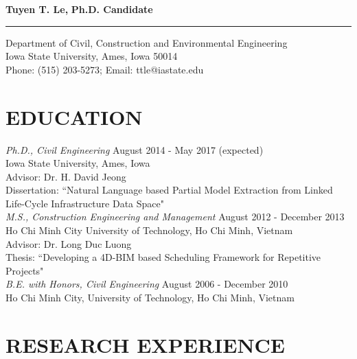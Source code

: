 \documentclass[11pt]{article}
\begin{document}
{\huge\bf Tuyen T. Le,} {\large\bf Ph.D. Candidate}\\ %
\noindent\rule{\linewidth}{1.25pt}
Department of Civil, Construction and Environmental Engineering\\ %
Iowa State University, Ames, Iowa 50014\\
Phone: (515) 203-5273; Email: ttle@iastate.edu
\section*{EDUCATION}

{\sl Ph.D., Civil Engineering}  \hfill August 2014 - May 2017 (expected) \\
Iowa State University, Ames, Iowa\\
Advisor: Dr. H. David Jeong\\
Dissertation: ``Natural Language based Partial Model Extraction from Linked Life-Cycle Infrastructure Data Space"\\

{\sl M.S., Construction Engineering and Management}  \hfill August 2012 - December 2013 \\
Ho Chi Minh City University of Technology, Ho Chi Minh, Vietnam\\
Advisor: Dr. Long Duc Luong\\
Thesis: ``Developing a 4D-BIM based Scheduling Framework for Repetitive Projects"\\

{\sl B.E. with Honors, Civil Engineering}  \hfill August 2006 - December 2010 \\
Ho Chi Minh City, University of Technology, Ho Chi Minh, Vietnam
\section*{RESEARCH EXPERIENCE}
\end{document}
